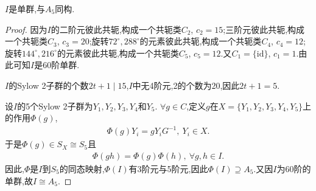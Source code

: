 \documentclass[../../main.tex]{subfiles}%
\begin{document}
\begin{theorem}
$I$是单群,与$A_5$同构.
\end{theorem}
\begin{proof}
因为$I$的二阶元彼此共轭,构成一个共轭类$C_2$, $c_2=15$;三阶元彼此共轭,构成一个共轭类$C_3$, $c_3=20$;旋转$72^\circ,288^\circ$的元素彼此共轭,构成一个共轭类$C_4$, $c_4=12$;旋转$144^\circ,216^\circ$的元素彼此共轭,构成一个共轭类$C_5$, $c_5=12$.又$C_1=\{\text{id}\}$, $c_1=1$.由此可知$I$是60阶单群.

$I$的Sylow 2子群的个数$2t+1\mid15$,$I$中无4阶元,2的个数为20,因此$2t+1=5$.

设$I$的5个Sylow 2子群为$Y_1,Y_2,Y_3,Y_4$和$Y_5$. $\forall g\in C$,定义$g$在$X=\{Y_1,Y_2,Y_3,Y_4,Y_5\}$上的作用$\Phi(g)$,
\begin{align*}
\Phi(g)Y_i=gY_iG^{-1},\ Y_i\in X.
\end{align*}
于是$\Phi(g)\in S_X\cong S_5$且
\begin{align*}
\Phi(gh)=\Phi(g)\Phi(h),\ \forall g,h\in I.
\end{align*}
因此,$\Phi$是$I$到$S_5$的同态映射,$\Phi(I)$有3阶元与5阶元,因此$\Phi(I)\supseteq A_5$.又因$I$为60阶的单群,故$I\cong A_5$.
\end{proof}
\end{document}
